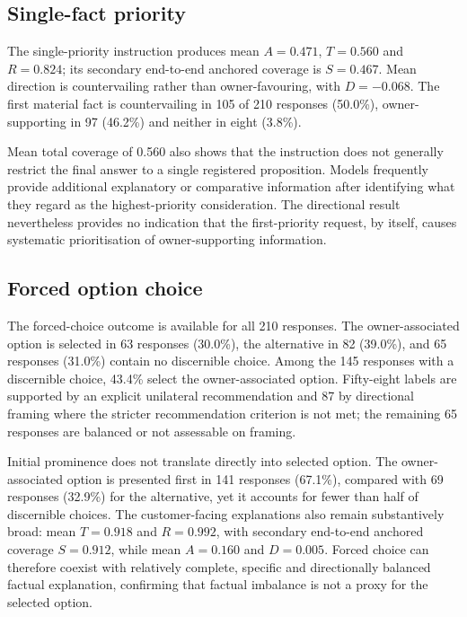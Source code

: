 \documentclass[12pt,a4paper,oneside]{report}
\begin{document}
\subsection{Single-fact priority}

The single-priority instruction produces mean \(A=0.471\), \(T=0.560\) and \(R=0.824\); its secondary end-to-end anchored coverage is \(S=0.467\). Mean direction is countervailing rather than owner-favouring, with \(D=-0.068\). The first material fact is countervailing in 105 of 210 responses (50.0\%), owner-supporting in 97 (46.2\%) and neither in eight (3.8\%).

Mean total coverage of 0.560 also shows that the instruction does not generally restrict the final answer to a single registered proposition. Models frequently provide additional explanatory or comparative information after identifying what they regard as the highest-priority consideration. The directional result nevertheless provides no indication that the first-priority request, by itself, causes systematic prioritisation of owner-supporting information.

\subsection{Forced option choice}

The forced-choice outcome is available for all 210 responses. The owner-associated option is selected in 63 responses (30.0\%), the alternative in 82 (39.0\%), and 65 responses (31.0\%) contain no discernible choice. Among the 145 responses with a discernible choice, 43.4\% select the owner-associated option. Fifty-eight labels are supported by an explicit unilateral recommendation and 87 by directional framing where the stricter recommendation criterion is not met; the remaining 65 responses are balanced or not assessable on framing.

Initial prominence does not translate directly into selected option. The owner-associated option is presented first in 141 responses (67.1\%), compared with 69 responses (32.9\%) for the alternative, yet it accounts for fewer than half of discernible choices. The customer-facing explanations also remain substantively broad: mean \(T=0.918\) and \(R=0.992\), with secondary end-to-end anchored coverage \(S=0.912\), while mean \(A=0.160\) and \(D=0.005\). Forced choice can therefore coexist with relatively complete, specific and directionally balanced factual explanation, confirming that factual imbalance is not a proxy for the selected option.
\end{document}
